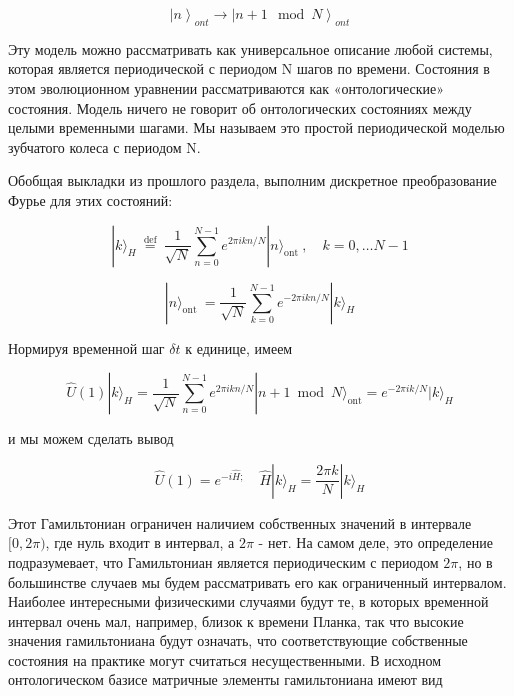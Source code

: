 \documentclass[main.tex]{subfiles}
\begin{document}
\begin{equation}\label{2.20}
	\left|n\right>_{ont} \rightarrow \left|n + 1 \mod N\right>_{ont}
\end{equation}
             
Эту модель можно рассматривать как универсальное описание любой системы, которая является периодической с периодом N шагов по времени. Состояния в этом эволюционном уравнении рассматриваются как «онтологические» состояния. Модель ничего не говорит об онтологических состояниях между целыми временными шагами. Мы называем это простой периодической моделью зубчатого колеса с периодом N.

Обобщая выкладки из прошлого раздела, выполним дискретное преобразование Фурье для этих состояний:

\begin{equation}\label{2.21}
	|k\rangle_{H} \stackrel{\text { def }}{=} \frac{1}{\sqrt{N}} \sum_{n=0}^{N-1} e^{2 \pi i k n / N}|n\rangle_{\text {ont }}, \quad k=0, \ldots N-1
\end{equation}

\begin{equation}\label{2.22}
	|n\rangle_{\text {ont }}=\frac{1}{\sqrt{N}} \sum_{k=0}^{N-1} e^{-2 \pi i k n / N}|k\rangle_{H}
\end{equation}

Нормируя временной шаг $\delta t$ к единице, имеем


\begin{equation}\label{2.23}
	\hat U(1)|k\rangle_{H}=\frac{1}{\sqrt{N}} \sum_{n=0}^{N-1} e^{2 \pi i k n / N}|n+1 \bmod N\rangle_{\mathrm{ont}}=e^{-2 \pi i k / N}|k\rangle_{H}
\end{equation}

и мы можем сделать вывод

\begin{equation}\label{2.24}
	\hat U(1)=e^{-i \hat H ;} \quad \hat H|k\rangle_{H}=\frac{2 \pi k}{N}|k\rangle_{H}
\end{equation}
                         
Этот Гамильтониан ограничен наличием собственных значений в интервале $[0, 2\pi)$, где нуль входит в интервал, а $2\pi$ - нет. На самом деле, это определение подразумевает, что Гамильтониан является периодическим с периодом $2\pi$, но в большинстве случаев мы будем рассматривать его как ограниченный интервалом. Наиболее интересными физическими случаями будут те, в которых временной интервал очень мал, например, близок к времени Планка, так что высокие значения гамильтониана будут означать, что соответствующие собственные состояния на практике могут считаться несущественными.
В исходном онтологическом базисе матричные элементы гамильтониана имеют вид
\end{document}
